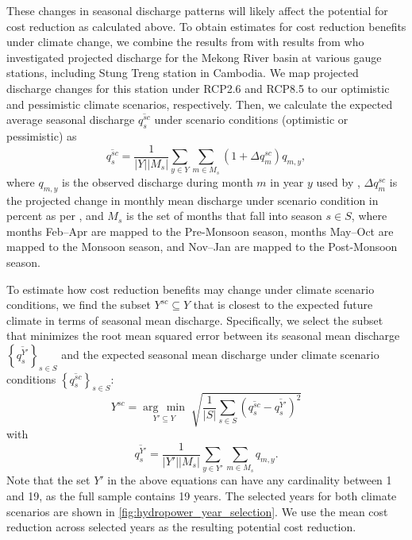 \documentclass[
  final,
  10pt,
  letterpaper,
  english,
]{article}
\newcommand{\argmin}[1]{\underset{#1}{\operatorname{arg}\,\operatorname{min}}\;}
\begin{document}
These changes in seasonal discharge patterns will likely affect the potential
for cost reduction as calculated above. To obtain estimates for cost reduction
benefits under climate change, we combine the results from
\cite{koh_evaluating_2024} with results from \cite{wang2024historical} who
investigated projected discharge for the Mekong River basin at various gauge
stations, including Stung Treng station in Cambodia. We map projected
discharge changes for this station under RCP2.6 and RCP8.5 to our
optimistic and pessimistic climate scenarios, respectively. Then, we calculate
the expected average seasonal discharge $\overline{q_s^{sc}}$ under scenario
conditions (optimistic or pessimistic) as
\begin{equation}
  \overline{q_s^{sc}} = \frac{1}{|Y| |M_s|} \sum_{y\in Y} \sum_{m\in M_s} \left(1 + \Delta q_m^{sc}\right) q_{m,y},
\end{equation}
where $q_{m, y}$ is the observed discharge during month $m$ in year $y$ used by
\cite{koh_evaluating_2024}, $\Delta q_m^{sc}$ is the projected change in monthly
mean discharge under scenario condition in percent as per
\cite{wang2024historical}, and $M_s$ is the set of months that fall into season
$s\in S$, where months Feb--Apr are mapped to the Pre-Monsoon season, months May--Oct
are mapped to the Monsoon season, and Nov--Jan are mapped to the Post-Monsoon
season. 

To estimate how cost reduction benefits may change under climate scenario
conditions, we find the subset $Y^{sc}\subseteq Y$ that is closest to the
expected future climate in terms of seasonal mean discharge. Specifically, we
select the subset that minimizes the root mean squared error between
its seasonal mean discharge $\left\{{\overline{q_s^{Y'}}}\right\}_{s\in S}$ and
the expected seasonal mean discharge under climate scenario conditions
$\left\{{\overline{q_s^{sc}}}\right\}_{s\in S}$:
\begin{equation}
  Y^{sc} = \argmin{Y'\subseteq Y} \sqrt{\frac{1}{|S|}\sum_{s \in S}\left(\overline{q_s^{sc}} - \overline{q_s^{Y'}}\right)^2}
\end{equation}
with 
\begin{equation}
  \overline{q_s^{Y'}} = \frac{1}{|Y'| |M_s|} \sum_{y\in Y'} \sum_{m\in M_s} q_{m,y}.
\end{equation}
Note that the set $Y'$ in the above equations can have any cardinality between 1
and 19, as the full sample contains 19 years. The selected years for both
climate scenarios are shown in \cref{fig:hydropower_year_selection}. We use the
mean cost reduction across selected years as the resulting potential cost
reduction. 
\end{document}
